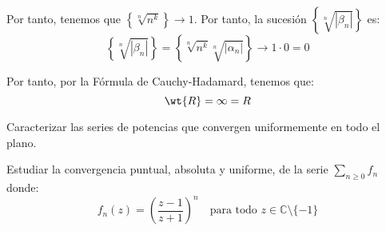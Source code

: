 \begin{ejercicio}
\begin{enumerate}
\begin{itemize}
            Por tanto, tenemos que $\left\{\sqrt[n]{n^k}\right\}\to 1$. Por tanto, la sucesión $\left\{\sqrt[n]{|\beta_n|}\right\}$ es:
            \begin{equation*}
                \left\{\sqrt[n]{|\beta_n|}\right\} = \left\{\sqrt[n]{n^k}\sqrt[n]{|\alpha_n|}\right\}\to 1\cdot 0 = 0
            \end{equation*}

            Por tanto, por la Fórmula de Cauchy-Hadamard, tenemos que:
            \begin{equation*}
                \wt{R} = \infty = R
            \end{equation*}

        \end{itemize}
    \end{enumerate}
\end{ejercicio}

\begin{ejercicio}
    Caracterizar las series de potencias que convergen uniformemente en todo el plano.
\end{ejercicio}

\begin{ejercicio}
    Estudiar la convergencia puntual, absoluta y uniforme, de la serie $\displaystyle \sum_{n \geq 0} f_n$ donde:
    \[
        f_n(z) = \left(\dfrac{z-1}{z+1}\right)^n \quad \text{para todo } z \in \mathbb{C}\setminus\{-1\}
    \]
\end{ejercicio}